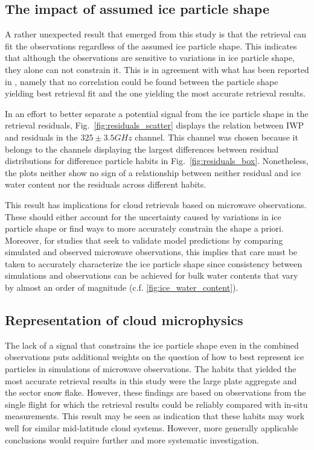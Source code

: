 \documentclass[journal abbreviation, manuscript]{copernicus}
\begin{document}
\subsection{The impact of assumed ice particle shape}

A rather unexpected result that emerged from this study is that the retrieval
can fit the observations regardless of the assumed ice particle shape. This
indicates that although the observations are sensitive to variations in ice
particle shape, they alone can not constrain it. This is in agreement with what
has been reported in \citet{pfreundschuh19}, namely that no correlation could be
found between the particle shape yielding best retrieval fit and the one
yielding the most accurate retrieval results.

In an effort to better separate a potential signal from the ice particle shape
in the retrieval residuals, Fig.~\ref{fig:residuals_scatter} displays the
relation between IWP and residuals in the $325 \pm 3.5 \unit{GHz}$ channel. This
channel was chosen because it belongs to the channels displaying the largest
differences between residual distributions for difference particle habits in
Fig.~\ref{fig:residuals_box}. Nonetheless, the plots neither show no sign of a
relationship between neither residual and ice water content nor the residuals
across different habits.

This result has implications for cloud retrievals based on microwave
observations. These should either account for the uncertainty caused by
variations in ice particle shape or find ways to more accurately constrain the
shape a priori. Moreover, for studies that seek to validate model predictions by
comparing simulated and observed microwave observations, this implies that care
must be taken to accurately characterize the ice particle shape since
consistency between simulations and observations can be achieved for bulk water
contents that vary by almost an order of magnitude (c.f.
\ref{fig:ice_water_content}).

\subsection{Representation of cloud microphysics}

The lack of a signal that constrains the ice particle shape even in the combined
observations puts additional weights on the question of how to best represent
ice particles in simulations of microwave observations. The habits that yielded
the most accurate retrieval results in this study were the large plate aggregate
and the sector snow flake. However, these findings are based on observations
from the single flight for which the retrieval results could be reliably
compared with in-situ measurements. This result may be seen as indication that
these habits may work well for similar mid-latitude cloud systems. However, more
generally applicable conclusions would require further and more systematic
investigation.
\end{document}
